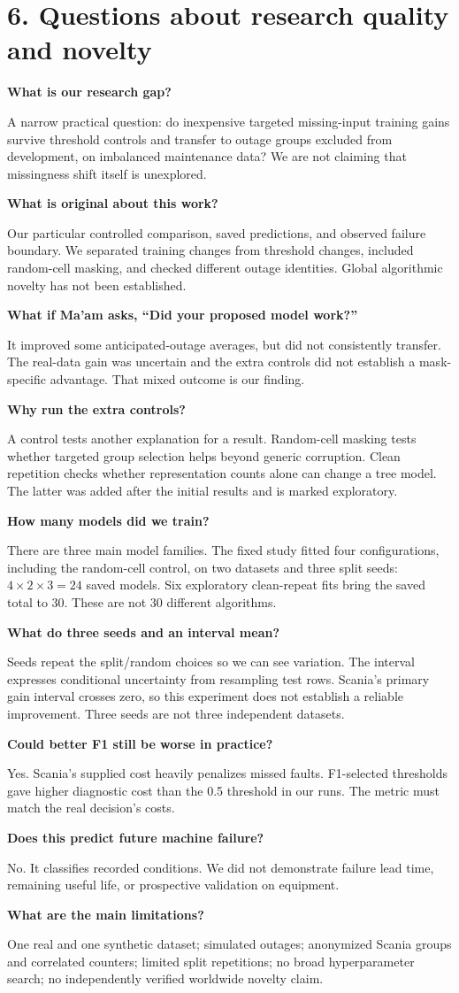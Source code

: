 \documentclass[11pt,a4paper]{article}
\newcommand{\qa}[2]{\textbf{#1}\par #2\par}
\begin{document}
\newpage
\begingroup\small
\section*{6. Questions about research quality and novelty}
\qa{What is our research gap?}{A narrow practical question: do inexpensive targeted missing-input training gains survive threshold controls and transfer to outage groups excluded from development, on imbalanced maintenance data? We are not claiming that missingness shift itself is unexplored.}
\qa{What is original about this work?}{Our particular controlled comparison, saved predictions, and observed failure boundary. We separated training changes from threshold changes, included random-cell masking, and checked different outage identities. Global algorithmic novelty has not been established.}
\qa{What if Ma'am asks, ``Did your proposed model work?''}{It improved some anticipated-outage averages, but did not consistently transfer. The real-data gain was uncertain and the extra controls did not establish a mask-specific advantage. That mixed outcome is our finding.}
\qa{Why run the extra controls?}{A control tests another explanation for a result. Random-cell masking tests whether targeted group selection helps beyond generic corruption. Clean repetition checks whether representation counts alone can change a tree model. The latter was added after the initial results and is marked exploratory.}
\qa{How many models did we train?}{There are three main model families. The fixed study fitted four configurations, including the random-cell control, on two datasets and three split seeds: $4\times2\times3=24$ saved models. Six exploratory clean-repeat fits bring the saved total to 30. These are not 30 different algorithms.}
\qa{What do three seeds and an interval mean?}{Seeds repeat the split/random choices so we can see variation. The interval expresses conditional uncertainty from resampling test rows. Scania's primary gain interval crosses zero, so this experiment does not establish a reliable improvement. Three seeds are not three independent datasets.}
\qa{Could better F1 still be worse in practice?}{Yes. Scania's supplied cost heavily penalizes missed faults. F1-selected thresholds gave higher diagnostic cost than the 0.5 threshold in our runs. The metric must match the real decision's costs.}
\qa{Does this predict future machine failure?}{No. It classifies recorded conditions. We did not demonstrate failure lead time, remaining useful life, or prospective validation on equipment.}
\qa{What are the main limitations?}{One real and one synthetic dataset; simulated outages; anonymized Scania groups and correlated counters; limited split repetitions; no broad hyperparameter search; no independently verified worldwide novelty claim.}
\end{document}
